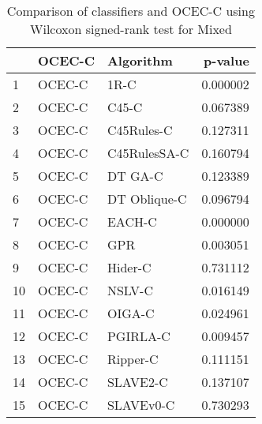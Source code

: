 \begin{table}
\footnotesize
\caption{Comparison of classifiers and OCEC-C using Wilcoxon signed-rank test for Mixed}
\label{tab:OCEC-C wilcoxon Mixed comparison}
\begin{tabular}{lllr}
\hline
 & OCEC-C & Algorithm & p-value \\
\hline
1 & OCEC-C & 1R-C & 0.000002 \\
2 & OCEC-C & C45-C & 0.067389 \\
3 & OCEC-C & C45Rules-C & 0.127311 \\
4 & OCEC-C & C45RulesSA-C & 0.160794 \\
5 & OCEC-C & DT GA-C & 0.123389 \\
6 & OCEC-C & DT Oblique-C & 0.096794 \\
7 & OCEC-C & EACH-C & 0.000000 \\
8 & OCEC-C & GPR & 0.003051 \\
9 & OCEC-C & Hider-C & 0.731112 \\
10 & OCEC-C & NSLV-C & 0.016149 \\
11 & OCEC-C & OIGA-C & 0.024961 \\
12 & OCEC-C & PGIRLA-C & 0.009457 \\
13 & OCEC-C & Ripper-C & 0.111151 \\
14 & OCEC-C & SLAVE2-C & 0.137107 \\
15 & OCEC-C & SLAVEv0-C & 0.730293 \\
\hline
\end{tabular}
\end{table}
